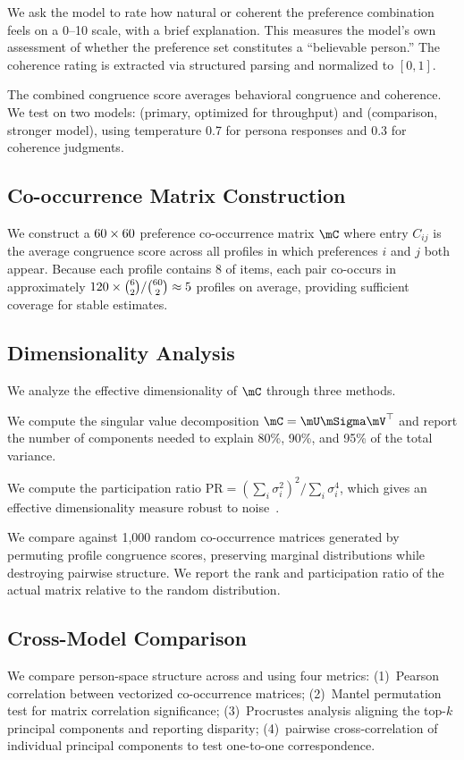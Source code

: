 We ask the model to rate how natural or coherent the preference combination feels on a 0--10 scale, with a brief explanation.
This measures the model's own assessment of whether the preference set constitutes a ``believable person.''
The coherence rating is extracted via structured parsing and normalized to $[0, 1]$.

The combined congruence score averages behavioral congruence and coherence.
We test on two models: \nano (primary, optimized for throughput) and \mini (comparison, stronger model), using temperature 0.7 for persona responses and 0.3 for coherence judgments.

\subsection{Co-occurrence Matrix Construction}
\label{sec:cooccurrence}

We construct a $60 \times 60$ preference co-occurrence matrix $\mC$ where entry $C_{ij}$ is the average congruence score across all profiles in which preferences $i$ and $j$ both appear.
Because each profile contains 8 of \nprefs{} items, each pair co-occurs in approximately $120 \times \binom{6}{2} / \binom{60}{2} \approx 5$ profiles on average, providing sufficient coverage for stable estimates.

\subsection{Dimensionality Analysis}
\label{sec:dimanalysis}

We analyze the effective dimensionality of $\mC$ through three methods.

We compute the singular value decomposition $\mC = \mU \mSigma \mV^\top$ and report the number of components needed to explain 80\%, 90\%, and 95\% of the total variance.

We compute the participation ratio $\text{PR} = (\sum_i \sigma_i^2)^2 / \sum_i \sigma_i^4$, which gives an effective dimensionality measure robust to noise~\citep{bose2025lore}.

We compare against 1,000 random co-occurrence matrices generated by permuting profile congruence scores, preserving marginal distributions while destroying pairwise structure.
We report the rank and participation ratio of the actual matrix relative to the random distribution.

\subsection{Cross-Model Comparison}
\label{sec:crossmodel}

We compare person-space structure across \nano and \mini using four metrics:
(1)~Pearson correlation between vectorized co-occurrence matrices;
(2)~Mantel permutation test for matrix correlation significance;
(3)~Procrustes analysis aligning the top-$k$ principal components and reporting disparity;
(4)~pairwise cross-correlation of individual principal components to test one-to-one correspondence.
